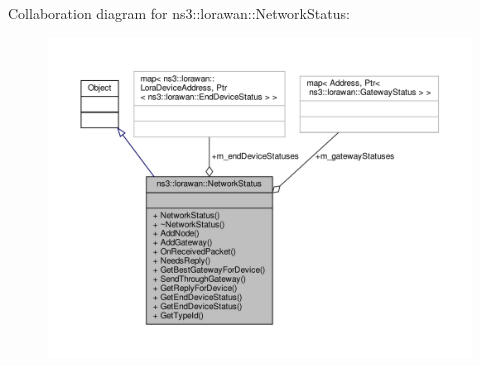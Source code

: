 Collaboration diagram for ns3\+:\+:lorawan\+:\+:Network\+Status\+:
\nopagebreak
\begin{figure}[H]
\begin{center}
\leavevmode
\includegraphics[width=350pt]{classns3_1_1lorawan_1_1NetworkStatus__coll__graph}
\end{center}
\end{figure}
